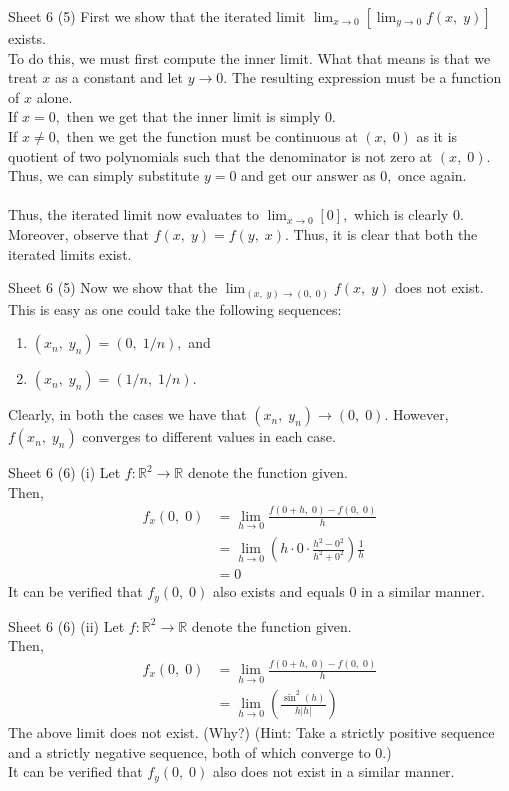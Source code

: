 \documentclass[handout, aspectratio=169]{beamer}
\begin{document}
\begin{frame}{Sheet 6}
	(5) First we show that the iterated limit $\displaystyle\lim_{x\to 0}\left[\displaystyle\lim_{y\to 0}f(x,\;y)\right]$ exists.\\
	To do this, we must first compute the inner limit. What that means is that we treat $x$ as a constant and let $y \to 0.$ The resulting expression must be a function of $x$ alone.\\
	If $x = 0,$ then we get that the inner limit is simply $0.$\\
	If $x \neq 0,$ then we get the function must be continuous at $(x,\;0)$ as it is quotient of two polynomials such that the denominator is not zero at $(x,\;0).$ Thus, we can simply substitute $y = 0$ and get our answer as $0,$ once again.\\~\\
	Thus, the iterated limit now evaluates to $\displaystyle\lim_{x\to 0}[0],$ which is clearly $0.$ Moreover, observe that $f(x,\;y) = f(y,\;x).$ Thus, it is clear that both the iterated limits exist.
\end{frame}
\begin{frame}{Sheet 6}
	(5) Now we show that the $\displaystyle\lim_{(x,\;y)\to (0,\;0)}f(x,\;y)$ does not exist.\\
	This is easy as one could take the following sequences:
	\begin{enumerate} 
		\item $\left(x_n,\;y_n\right) = (0,\;1/n),$ and
		\item $(x_n,\;y_n) = (1/n,\;1/n).$
	\end{enumerate}
	Clearly, in both the cases we have that $(x_n,\;y_n) \to (0,\;0).$ However, $f(x_n,\;y_n)$ converges to different values in each case.
\end{frame}
\begin{frame}{Sheet 6}
	(6) (i) Let $f:\mathbb{R}^2 \to \mathbb{R}$ denote the function given.\\
	Then, 
	\begin{align*}
		f_x(0,\;0) &= \displaystyle\lim_{h\to 0}\frac{f(0+h,\;0) - f(0,\;0)}{h}\\
		&= \displaystyle\lim_{h\to 0}\left(h\cdot0\cdot\frac{h^2 - 0^2}{h^2 + 0^2}\right)\frac{1}{h} \\
		&= 0
	\end{align*}
	It can be verified that $f_y(0,\;0)$ also exists and equals $0$ in a similar manner.
\end{frame}
\begin{frame}{Sheet 6}
	(6) (ii) Let $f:\mathbb{R}^2 \to \mathbb{R}$ denote the function given.\\
	Then, 
	\begin{align*}
		f_x(0,\;0) &= \displaystyle\lim_{h\to 0}\frac{f(0+h,\;0) - f(0,\;0)}{h}\\
		&= \displaystyle\lim_{h\to 0}\left(\frac{\sin^2(h)}{h|h|}\right)
	\end{align*}
	The above limit does not exist. \hfill (Why?)
	(Hint: Take a strictly positive sequence and a strictly negative sequence, both of which converge to 0.)\\
	It can be verified that $f_y(0,\;0)$ also does not exist in a similar manner.
\end{frame}
\end{document}
